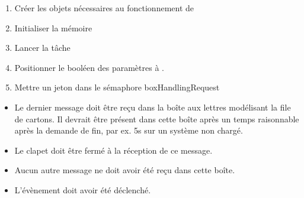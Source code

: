 {
\begin{enumerate}
	\item Créer les objets nécessaires au fonctionnement de 
	\item Initialiser la mémoire 
	\item Lancer la tâche 
	\item Positionner le booléen  des paramètres à .
	\item Mettre un jeton dans le sémaphore boxHandlingRequest
\end{enumerate}
}
{
\begin{itemize}
	\item Le dernier message doit être reçu dans la boîte aux lettres modélisant la file de cartons. Il devrait être présent dans cette boîte après un temps raisonnable après la demande de fin, par ex. 5s sur un système non chargé.
	\item Le clapet doit être fermé à la réception de ce message.
	\item Aucun autre message ne doit avoir été reçu dans cette boîte.
	\item L'évènement  doit avoir été déclenché.
\end{itemize}
}

